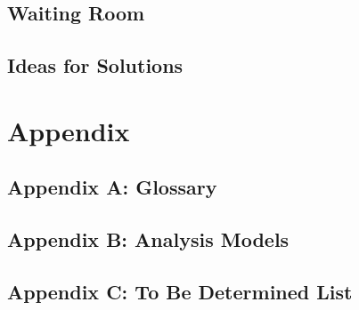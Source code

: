 \documentclass{scrreprt}
\begin{document}
\section{Waiting Room}

\section{Ideas for Solutions}

\chapter{Appendix}

\section{Appendix A: Glossary}

\section{Appendix B: Analysis Models}

\section{Appendix C: To Be Determined List}
\end{document}
